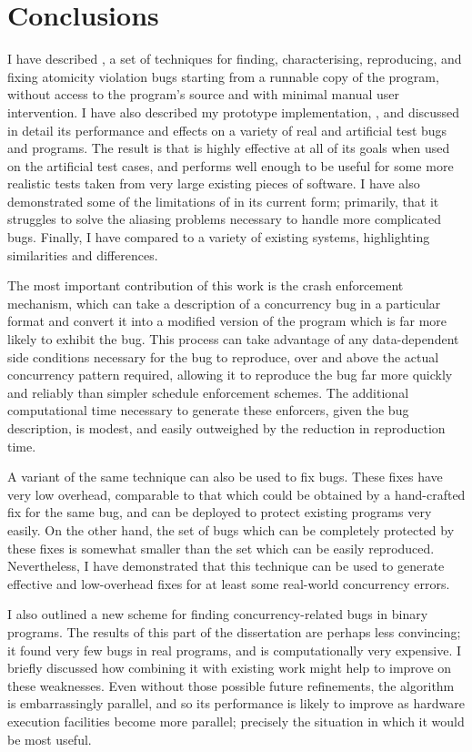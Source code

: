 \chapter{Conclusions}

I have described {\technique}, a set of techniques for finding,
characterising, reproducing, and fixing atomicity violation bugs
starting from a runnable copy of the program, without access to the
program's source and with minimal manual user intervention.  I have
also described my prototype implementation, {\implementation}, and
discussed in detail its performance and effects on a variety of real
and artificial test bugs and programs.  The result is that
{\technique} is highly effective at all of its goals when used on the
artificial test cases, and performs well enough to be useful for some
more realistic tests taken from very large existing pieces of
software.  I have also demonstrated some of the limitations of
{\technique} in its current form; primarily, that it struggles to
solve the aliasing problems necessary to handle more complicated bugs.
Finally, I have compared {\technique} to a variety of existing
systems, highlighting similarities and differences.

The most important contribution of this work is the crash enforcement
mechanism, which can take a description of a concurrency bug in a
particular format and convert it into a modified version of the
program which is far more likely to exhibit the bug.  This process can
take advantage of any data-dependent side conditions necessary for the
bug to reproduce, over and above the actual concurrency pattern
required, allowing it to reproduce the bug far more quickly and
reliably than simpler schedule enforcement schemes.  The additional
computational time necessary to generate these enforcers, given the
bug description, is modest, and easily outweighed by the reduction in
reproduction time.

A variant of the same technique can also be used to fix bugs.  These
fixes have very low overhead, comparable to that which could be
obtained by a hand-crafted fix for the same bug, and can be deployed
to protect existing programs very easily.  On the other hand, the set
of bugs which can be completely protected by these fixes is somewhat
smaller than the set which can be easily reproduced.  Nevertheless, I
have demonstrated that this technique can be used to generate
effective and low-overhead fixes for at least some real-world
concurrency errors.

I also outlined a new scheme for finding concurrency-related bugs in
binary programs.  The results of this part of the dissertation are
perhaps less convincing; it found very few bugs in real programs, and
is computationally very expensive.  I briefly discussed how combining
it with existing work might help to improve on these weaknesses.  Even
without those possible future refinements, the algorithm is
embarrassingly parallel, and so its performance is likely to improve
as hardware execution facilities become more parallel; precisely the
situation in which it would be most useful.
